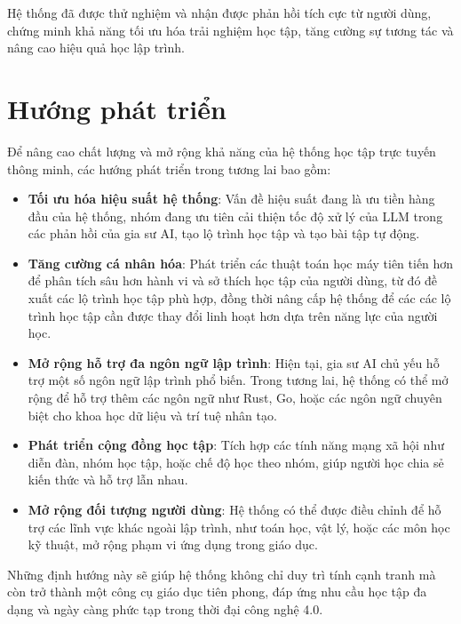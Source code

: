 Hệ thống đã được thử nghiệm và nhận được phản hồi tích cực từ người dùng, chứng minh khả năng tối ưu hóa trải nghiệm học tập, tăng cường sự tương tác và nâng cao hiệu quả học lập trình.

\section{Hướng phát triển}

Để nâng cao chất lượng và mở rộng khả năng của hệ thống học tập trực tuyến thông minh, các hướng phát triển trong tương lai bao gồm:

\begin{itemize}
	\item \textbf{Tối ưu hóa hiệu suất hệ thống}: Vấn đề hiệu suất đang là ưu tiền hàng đầu của hệ thống, nhóm đang ưu tiên cải thiện tốc độ xử lý của LLM trong các phản hồi của gia sư AI, tạo lộ trình học tập và tạo bài tập tự động.
	\item \textbf{Tăng cường cá nhân hóa}: Phát triển các thuật toán học máy tiên tiến hơn để phân tích sâu hơn hành vi và sở thích học tập của người dùng, từ đó đề xuất các lộ trình học tập phù hợp, đồng thời nâng cấp hệ thống để các các lộ trình học tập cần được thay đổi linh hoạt hơn dựa trên năng lực của người học.
	\item \textbf{Mở rộng hỗ trợ đa ngôn ngữ lập trình}: Hiện tại, gia sư AI chủ yếu hỗ trợ một số ngôn ngữ lập trình phổ biến. Trong tương lai, hệ thống có thể mở rộng để hỗ trợ thêm các ngôn ngữ như Rust, Go, hoặc các ngôn ngữ chuyên biệt cho khoa học dữ liệu và trí tuệ nhân tạo.
	\item \textbf{Phát triển cộng đồng học tập}: Tích hợp các tính năng mạng xã hội như diễn đàn, nhóm học tập, hoặc chế độ học theo nhóm, giúp người học chia sẻ kiến thức và hỗ trợ lẫn nhau.
	\item \textbf{Mở rộng đối tượng người dùng}: Hệ thống có thể được điều chỉnh để hỗ trợ các lĩnh vực khác ngoài lập trình, như toán học, vật lý, hoặc các môn học kỹ thuật, mở rộng phạm vi ứng dụng trong giáo dục.
\end{itemize}

Những định hướng này sẽ giúp hệ thống không chỉ duy trì tính cạnh tranh mà còn trở thành một công cụ giáo dục tiên phong, đáp ứng nhu cầu học tập đa dạng và ngày càng phức tạp trong thời đại công nghệ 4.0.